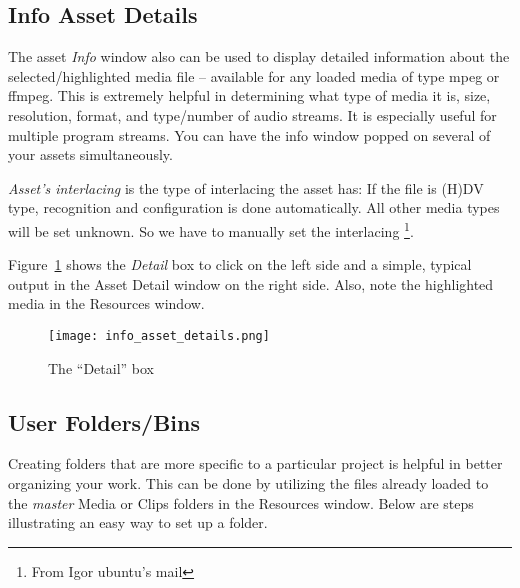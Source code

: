 \subsection{Info Asset Details}%
\label{sub:info_asset_details}

The asset \emph{Info} window also can be used to display detailed information about the selected/highlighted media file -- available for any loaded media of type mpeg or ffmpeg.  
This is extremely helpful in determining what type of media it is, size, resolution, format, and type/number of audio streams.  It is especially useful for multiple program streams.  You can have the info window popped on several of your assets simultaneously.

\textit{Asset's interlacing}  is the type of interlacing the asset has: If the file is (H)DV type, recognition and configuration is done automatically. All other media types will be set unknown. So we have to manually set the interlacing \protect\footnote{From Igor ubuntu's mail}.

Figure~\ref{fig:info_asset_details} shows the \textit{Detail} box to click on the left side and a simple, typical output in the Asset Detail window on the right side.  Also, note the highlighted media in the Resources window.

\begin{figure}[htpb]
    \centering
    \texttt{[image: info\_asset\_details.png]}
    \caption{The “Detail” box}
    \label{fig:info_asset_details}
\end{figure}

\subsection{User Folders/Bins}%
\label{sub:user_folders_bins}

Creating folders that are more specific to a particular project is helpful in better organizing your work.  
This can be done by utilizing the files already loaded to the \textit{master} Media or Clips folders in the Resources window.  
Below are steps illustrating an easy way to set up a folder.


